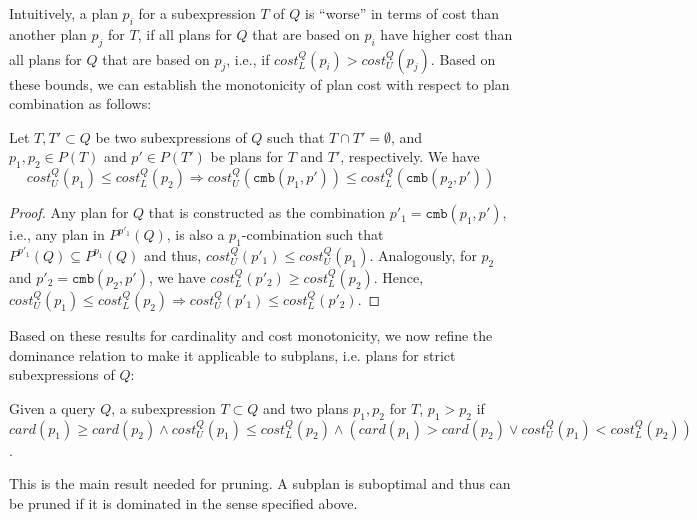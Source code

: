Intuitively, a plan $p_i$ for a subexpression $T$ of $Q$ is ``worse''
in terms of cost than another plan $p_j$ for $T$, if all plans for $Q$
that are based on $p_i$ have higher cost than all plans for $Q$ that
are based on $p_j$, i.e., if $cost_L^Q(p_i) > cost_U^Q(p_j)$. Based on
these bounds, we can establish the monotonicity of plan cost with
respect to plan combination as follows:
  
\begin{lemma}
  Let $T,T' \subset Q$ be two subexpressions of $Q$ such that $T \cap
  T' = \emptyset$, and $p_1,p_2 \in P(T)$ and $p' \in P(T')$ be plans
  for $T$ and $T'$, respectively. We have
    \[ cost^Q_U(p_1) \leq cost^Q_L(p_2) \Rightarrow
    cost^Q_U(\mathtt{cmb}(p_1,p')) \leq
    cost^Q_L(\mathtt{cmb}(p_2,p')) \]
\end{lemma}
\begin{proof}
  Any plan for $Q$ that is
  constructed as the combination $p'_1 = \mathtt{cmb}(p_1,p')$, i.e.,
  any plan in $P^{p'_1}(Q)$, is also a $p_1$-combination %
such that $P^{p'_1}(Q) \subseteq P^{p_1}(Q)$ and thus, $cost^Q_U(p'_1) \leq
  cost^Q_U(p_1)$. Analogously, for $p_2$ and $p'_2 = \mathtt{cmb}(p_2,p')$, we have $cost^Q_L(p'_2) \geq cost^Q_L(p_2)$. Hence, $cost^Q_U(p_1) \leq cost^Q_L(p_2) \Rightarrow
  cost^Q_U(p'_1) \leq cost^Q_L(p'_2)$. 
\end{proof}

Based on these results for cardinality and cost monotonicity, we now
refine the dominance relation to make it applicable to subplans,
i.e. plans for strict subexpressions of $Q$:

\begin{theorem}
  \label{def:dominates_bound}
  Given a query $Q$, a subexpression $T \subset Q$ and two plans
  $p_1,p_2$ for $T$, $p_1 > p_2$ if
  $card(p_1) \geq card(p_2) \wedge cost_U^Q(p_1) \leq cost_L^Q(p_2)
  \wedge (card(p_1) > card(p_2) \vee cost_U^Q(p_1) < cost_L^Q(p_2))$.
\end{theorem}

This is the main result needed for pruning. A subplan is suboptimal
and thus can be pruned if it is dominated in the sense specified
above.



